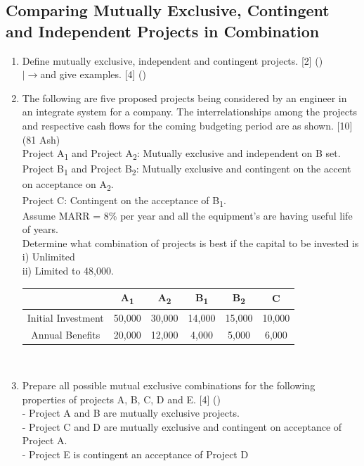 \documentclass[12pt]{article}
\newcommand{\lb}{\\ $\left|\rightarrow\right.$}
\newcommand{\sub}[1]{\textsubscript{#1}}
\begin{document}
	\subsection{Comparing Mutually Exclusive, Contingent and Independent Projects in Combination}
	\begin{enumerate}[noitemsep, topsep = 0pt]
		\item Define mutually exclusive, independent and contingent projects. \hfill [2] ()
		\lb and give examples. \hfill [4] ()
		
		\item The following are five proposed projects being considered by an engineer in an integrate system for a company. The interrelationships among the projects and respective cash flows for the coming budgeting period are as shown. \hfill [10] (81 Ash)\\
		Project A\sub{1} and Project A\sub{2}: Mutually exclusive and independent on B set.\\
		Project B\sub{1} and Project B\sub{2}: Mutually exclusive and contingent on the accent on acceptance on A\sub{2}.\\
		Project C: Contingent on the acceptance of B\sub{1}.\\
		Assume MARR = 8\% per year and all the equipment's are having useful life of years.\\
		Determine what combination of projects is best if the capital to be invested is\\
		i) Unlimited\\
		ii) Limited to 48,000.\\
		\begin{tabular}{|c|c|c|c|c|c|}
			\hline
			& A\sub{1} & A\sub{2} & B\sub{1} & B\sub{2} & C \\ \hline
			Initial Investment & 50,000 & 30,000 & 14,000 & 15,000 & 10,000 \\ \hline
			Annual Benefits & 20,000 & 12,000 & 4,000 & 5,000 & 6,000 \\ \hline
		\end{tabular}\\[0pt]
		
		\item Prepare all possible mutual exclusive combinations for the following properties of projects A, B, C, D and E. \hfill [4] ()\\
		- Project A and B are mutually exclusive projects.\\
		- Project C and D are mutually exclusive and contingent on acceptance of Project A.\\
		- Project E is contingent an acceptance of Project D 
	\end{enumerate}
\end{document}
